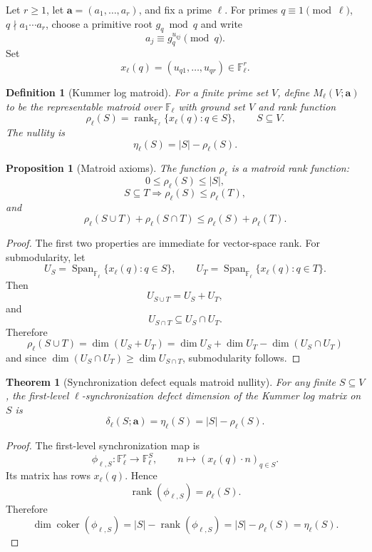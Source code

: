 \documentclass[11pt]{article}
\newtheorem{theorem}{Theorem}
\newtheorem{proposition}{Proposition}
\newtheorem{definition}{Definition}
\newcommand{\F}{\mathbb F}
\newcommand{\rank}{\operatorname{rank}}
\newcommand{\coker}{\operatorname{coker}}
\newcommand{\Span}{\operatorname{Span}}
\begin{document}
Let \(r\ge1\), let \(\mathbf a=(a_1,\ldots,a_r)\), and fix a prime \(\ell\).  For primes \(q\equiv1\pmod\ell\), \(q\nmid a_1\cdots a_r\), choose a primitive root \(g_q\bmod q\) and write
\[
a_j\equiv g_q^{u_{qj}}\pmod q.
\]
Set
\[
x_\ell(q)=(u_{q1},\ldots,u_{qr})\in\F_\ell^r.
\]

\begin{definition}[Kummer log matroid]\label{D:kummer-matroid}
For a finite prime set \(V\), define \(M_\ell(V;\mathbf a)\) to be the representable matroid over \(\F_\ell\) with ground set \(V\) and rank function
\[
\rho_\ell(S)=\rank_{\F_\ell}\{x_\ell(q):q\in S\},
\qquad S\subseteq V.
\]
The nullity is
\[
\eta_\ell(S)=|S|-\rho_\ell(S).
\]
\end{definition}

\begin{proposition}[Matroid axioms]\label{P:matroid-axioms}
The function \(\rho_\ell\) is a matroid rank function:
\[
0\le\rho_\ell(S)\le |S|,
\]
\[
S\subseteq T\Rightarrow \rho_\ell(S)\le\rho_\ell(T),
\]
and
\[
\rho_\ell(S\cup T)+\rho_\ell(S\cap T)\le \rho_\ell(S)+\rho_\ell(T).
\]
\end{proposition}

\begin{proof}
The first two properties are immediate for vector-space rank.  For submodularity, let
\[
U_S=\Span_{\F_\ell}\{x_\ell(q):q\in S\},
\qquad
U_T=\Span_{\F_\ell}\{x_\ell(q):q\in T\}.
\]
Then
\[
U_{S\cup T}=U_S+U_T,
\]
and
\[
U_{S\cap T}\subseteq U_S\cap U_T.
\]
Therefore
\[
\rho_\ell(S\cup T)
=
\dim(U_S+U_T)
=
\dim U_S+\dim U_T-\dim(U_S\cap U_T)
\]
and since \(\dim(U_S\cap U_T)\ge \dim U_{S\cap T}\), submodularity follows.
\end{proof}

\begin{theorem}[Synchronization defect equals matroid nullity]\label{T:defect-nullity}
For any finite \(S\subseteq V\), the first-level \(\ell\)-synchronization defect dimension of the Kummer log matrix on \(S\) is
\[
\delta_\ell(S;\mathbf a)=\eta_\ell(S)=|S|-\rho_\ell(S).
\]
\end{theorem}

\begin{proof}
The first-level synchronization map is
\[
\phi_{\ell,S}:\F_\ell^r\to\F_\ell^S,
\qquad
n\mapsto(x_\ell(q)\cdot n)_{q\in S}.
\]
Its matrix has rows \(x_\ell(q)\).  Hence
\[
\rank(\phi_{\ell,S})=\rho_\ell(S).
\]
Therefore
\[
\dim\coker(\phi_{\ell,S})=|S|-\rank(\phi_{\ell,S})=|S|-\rho_\ell(S)=\eta_\ell(S).
\]
\end{proof}
\end{document}
